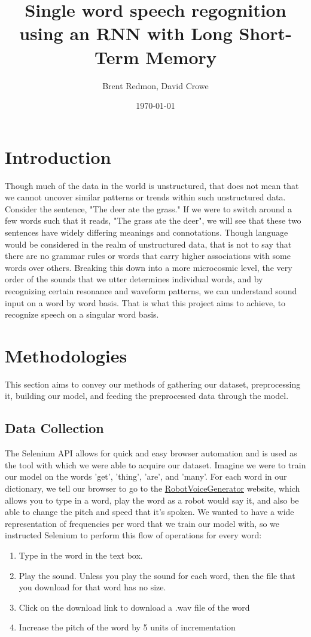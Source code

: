 \documentclass{article}
\title{Single word speech regognition using an RNN with Long Short-Term Memory}
\author{Brent Redmon, David Crowe}
\date{\today}
\begin{document}
 
\maketitle
 
\section{Introduction}

Though much of the data in the world is unstructured, that does not mean that we cannot uncover similar patterns or trends within such unstructured data. Consider the sentence, "The deer ate the grass." If we were to switch around a few words such that it reads, "The grass ate the deer", we will see that these two sentences have widely differing meanings and connotations. Though language would be considered in the realm of unstructured data, that is not to say that there are no grammar rules or words that carry higher associations with some words over others. Breaking this down into a more microcosmic level, the very order of the sounds that we utter determines individual words, and by recognizing certain resonance and waveform patterns, we can understand sound input on a word by word basis. That is what this project aims to achieve, to recognize speech on a singular word basis. 
 
\section{Methodologies}
 
This section aims to convey our methods of gathering our dataset, preprocessing it, building our model, and feeding the preprocessed data through the model. 

\subsection{Data Collection}

The Selenium API allows for quick and easy browser automation and is used as the tool with which we were able to acquire our dataset. Imagine we were to train our model on the words 'get', 'thing', 'are', and 'many'. For each word in our dictionary, we tell our browser to go to the \href{https://lingojam.com/RobotVoiceGenerator}{RobotVoiceGenerator} website, which allows you to type in a word, play the word as a robot would say it, and also be able to change the pitch and speed that it's spoken. We wanted to have a wide representation of frequencies per word that we train our model with, so we instructed Selenium to perform this flow of operations for every word:
\begin{enumerate}
  \item Type in the word in the text box. 
  \item Play the sound. Unless you play the sound for each word, then the file that you download for that word has no size. 
  \item Click on the download link to download a .wav file of the word
  \item Increase the pitch of the word by 5 units of incrementation
\end{enumerate}
\end{document}
